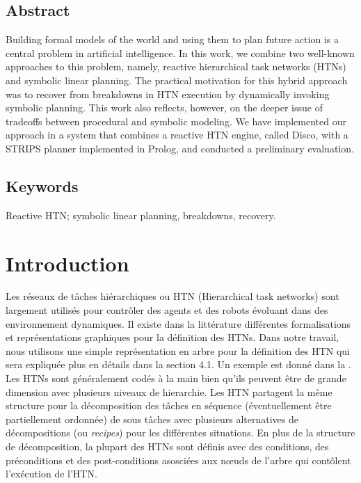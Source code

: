 \documentclass[a4paper,twoside,french]{article}
\begin{document}
				\subsection*{Abstract}
				Building formal models of the world and using them to plan future
				action is a central problem in artificial intelligence.  In this
				work, we combine two well-known approaches to this problem, namely,
				reactive hierarchical task networks (HTNs) and symbolic linear
				planning.  The practical motivation for this hybrid approach was to
				recover from breakdowns in HTN execution by dynamically invoking
				symbolic planning.  This work also reflects, however, on the deeper
				issue of tradeoffs between procedural and symbolic modeling.  We
				have implemented our approach in a system that combines a reactive
				HTN engine, called Disco, with a STRIPS planner implemented in
				Prolog, and conducted a preliminary evaluation.
				\subsection*{Keywords}
				Reactive HTN; symbolic linear planning, breakdowns, recovery.
				
				
				\section{Introduction}
				Les r\'eseaux de t\^aches hi\'erarchiques ou HTN \cite{erol1994htn} (Hierarchical task networks) sont largement utilis\'es pour contr\^oler des agents et des robots \'evoluant dans des environnement dynamiques. Il existe dans la litt\'erature diff\'erentes formalisations et  repr\'esentations graphiques pour la d\'efinition des HTNs. Dans notre travail, nous utilisons une simple repr\'esentation en arbre pour la  d\'efinition des HTN qui sera expliqu\'ee plus en d\'etails dans la section 4.1. Un exemple est donn\'e dans la .
				Les HTNs sont g\'en\'eralement cod\'es \`a la main bien qu'ils peuvent être de grande dimension avec plusieurs niveaux de hierarchie. Les HTN partagent la m\^eme structure pour la d\'ecomposition des t\^aches en s\'equence (éventuellement \^etre partiellement ordonn\'ee) de sous t\^aches avec plusieurs alternatives de d\'ecompositions (ou \emph{recipes}) pour les diff\'erentes situations. En plus de la structure de d\'ecomposition, la plupart des HTNs sont d\'efinis avec des conditions, des pr\'econditions et des post-conditions asosci\'ees aux n\oe uds de l'arbre qui  cont\^olent l'ex\'ecution de l'HTN.
								
\end{document}
